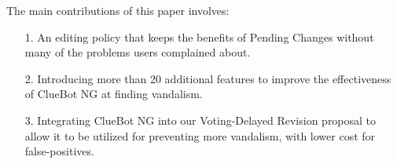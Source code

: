 The main contributions of this paper involves:
\begin{enumerate}
\item[1.] An editing policy that keeps the benefits of Pending Changes without many of the problems users complained about.
\item[2.] Introducing more than 20 additional features to improve the effectiveness of ClueBot NG at finding vandalism.
\item[3.] Integrating ClueBot NG into our Voting-Delayed Revision proposal to allow it to be utilized for preventing more vandalism, with lower cost for false-positives.
\end{enumerate}
